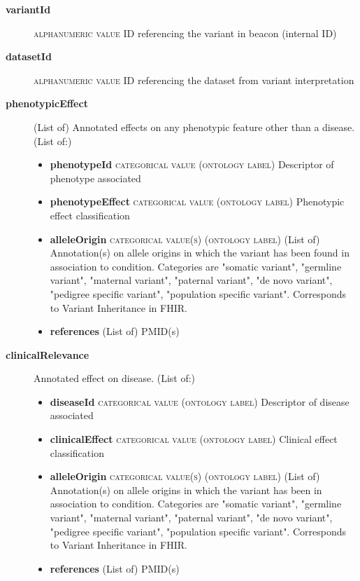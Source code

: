 \documentclass[a4paper, 10pt]{article}        %
\begin{document}
  \begin{description}
  	\item[\textbf{variantId}] {\textsc{alphanumeric value}} ID referencing the variant in beacon (internal ID)
	\item[\textbf{datasetId}] {\textsc{alphanumeric value}} ID referencing the dataset from variant interpretation
	\item[\textbf{phenotypicEffect}] (List of) Annotated effects on any phenotypic feature other than a disease. (List of:)
	\begin{itemize}
				\item[] \textbf{phenotypeId} {\textsc{categorical value (ontology label)}} Descriptor of phenotype associated
				\item[] \textbf{phenotypeEffect} {\textsc{categorical value (ontology label)}} Phenotypic effect classification
				\item[] \textbf{alleleOrigin} {\textsc{categorical value(s) (ontology label)}} (List of) Annotation(s) on allele origins in which the variant has been found in association to condition. Categories are "somatic variant", "germline variant", "maternal variant", "paternal variant",  "de novo variant", "pedigree specific variant", "population specific variant". Corresponds to Variant Inheritance in FHIR.
				\item[] \textbf{references} (List of) PMID(s)
	\end{itemize} 
	\item[\textbf{clinicalRelevance}] Annotated effect on disease. (List of:)
			\begin{itemize}
				\item[] \textbf{diseaseId} {\textsc{categorical value (ontology label)}} Descriptor of disease associated
				\item[] \textbf{clinicalEffect} {\textsc{categorical value (ontology label)}} Clinical effect classification
				\item[] \textbf{alleleOrigin} {\textsc{categorical value(s) (ontology label)}} (List of) Annotation(s) on allele origins in which the variant has been in association to condition. Categories are "somatic variant", "germline variant", "maternal variant", "paternal variant",  "de novo variant", "pedigree specific variant", "population specific variant". Corresponds to Variant Inheritance in FHIR.
				\item[] \textbf{references} (List of) PMID(s)
		 \end{itemize} 

 \end{description}
 
\end{document}
